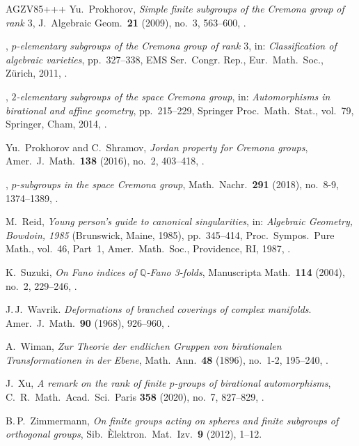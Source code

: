 \documentclass[11pt]{amsart}
\numberwithin{equation}{section}
\theoremstyle{definition}
\theoremstyle{remark}
\begin{document}
\begin{thebibliography}{AGZV85+++}
Yu.~Prokhorov, 
 {\em Simple finite subgroups of the Cremona group of rank $3$}, 
 J.~Algebraic Geom.\ \textbf{21} (2009), no.~3, 563--600,
 .

\bysame, 
{\em {$p$}-elementary subgroups of the {C}remona group of rank $3$}, 
in: {\em Classification of algebraic varieties}, pp.~327--338,
EMS Ser.\ Congr. Rep., Eur.\ Math.\ Soc., Z\"urich, 2011,
.

\bysame, 
 {\em $2$-elementary subgroups of the space {C}remona group},
 in: {\em Automorphisms in birational and affine geometry}, pp.~215--229, 
 Springer Proc.\ Math.\ Stat., vol.~79, Springer, Cham, 2014,
 .

Yu.~Prokhorov and C.~Shramov, 
 {\em Jordan property for Cremona groups},
 Amer.\ J.~Math.\ \textbf{138} (2016), no.~2, 403--418,
 .

\bysame, 
 {\em $p$-subgroups in the space Cremona group},
 Math.\ Nachr.\ \textbf{291} (2018), no.~8-9, 1374--1389, 
 .

M.~Reid, 
{\em Young person's guide to canonical singularities},
in: \emph{Algebraic  Geometry, {B}owdoin, 1985} ({B}runswick, {M}aine, 1985), pp.~345--414, Proc.\ Sympos.\ Pure  Math., vol.~46, Part~1, Amer.\ Math.\ Soc., Providence, RI, 1987, .

K.~Suzuki, 
 {\em On Fano indices of $\mathbb Q$-Fano 3-folds},
 Manuscripta Math.\ \textbf{114} (2004), no.~2, 229--246,
 . 

J.\,J.~Wavrik.
 {\em Deformations of branched coverings of complex manifolds}.
 Amer.~J.\ Math.\ \textbf{90} (1968), 926--960,
 .

A.~Wiman, 
 {\em Zur Theorie der endlichen Gruppen von birationalen Transformationen in der Ebene}, 
 Math.\ Ann.\ \textbf{48} (1896), no.~1-2, 195--240,
 .

J.~Xu, 
 {\em A remark on the rank of finite $p$-groups of birational
automorphisms}, 
 C.\ R.\ Math.\ Acad.\ Sci.\ Paris \textbf{358} (2020), no.~7, 827--829,
 . 

B.\,P.~Zimmermann, 
 {\em On finite groups acting on spheres and finite subgroups of orthogonal groups}, 
 Sib.\ \`Elektron.\ Mat.\ Izv.\ \textbf{9} (2012), 1--12.

\end{thebibliography}
\end{document}
